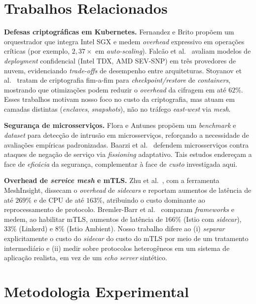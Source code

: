\documentclass[12pt]{article}
\begin{document}
\section{Trabalhos Relacionados}

\textbf{Defesas criptogr\'aficas em Kubernetes.} Fernandez e Brito \cite{fernandez2019} prop\~oem um orquestrador que integra Intel SGX e medem \textit{overhead} expressivo em opera\c{c}\~oes cr\'iticas (por exemplo, $2{,}37\times$ em \textit{auto-scaling}). Falc\~ao et al.\ \cite{falcao2025} avaliam modelos de \textit{deployment} confidencial (Intel TDX, AMD SEV-SNP) em tr\^es provedores de nuvem, evidenciando \textit{trade-offs} de desempenho entre arquiteturas. Stoyanov et al.\ \cite{stoyanov2024} tratam de criptografia fim-a-fim para \textit{checkpoint/restore} de \textit{containers}, mostrando que otimiza\c{c}\~oes podem reduzir o \textit{overhead} da cifragem em at\'e $62\%$. Esses trabalhos motivam nosso foco no custo da criptografia, mas atuam em camadas distintas (\textit{enclaves}, \textit{snapshots}), n\~ao no tr\'afego \textit{east-west} via \textit{mesh}.

\textbf{Seguran\c{c}a de microsservi\c{c}os.} Flora e Antunes \cite{flora2024} prop\~oem um \textit{benchmark} e \textit{dataset} para detec\c{c}\~ao de intrus\~ao em microsservi\c{c}os, refor\c{c}ando a necessidade de avalia\c{c}\~oes emp\'iricas padronizadas. Baarzi et al.\ \cite{baarzi2020} defendem microsservi\c{c}os contra ataques de nega\c{c}\~ao de servi\c{c}o via \textit{fissioning} adaptativo. Tais estudos endere\c{c}am a face de \emph{efic\'acia} da seguran\c{c}a, complementar \`a face de \emph{custo} investigada aqui.

\textbf{Overhead de \textit{service mesh} e mTLS.} Zhu et al.\ \cite{zhu2023}, com a ferramenta MeshInsight, dissecam o \textit{overhead} de \textit{sidecars} e reportam aumentos de lat\^encia de at\'e $269\%$ e de CPU de at\'e $163\%$, atribuindo o custo dominante ao reprocessamento de protocolo. Bremler-Barr et al.\ \cite{bremlerbarr2024} comparam \textit{frameworks} e medem, ao habilitar mTLS, aumentos de lat\^encia de $166\%$ (Istio com \textit{sidecar}), $33\%$ (Linkerd) e $8\%$ (Istio Ambient). Nosso trabalho difere ao (i) \emph{separar} explicitamente o custo do \textit{sidecar} do custo do mTLS por meio de um tratamento intermedi\'ario e (ii) medir sobre protocolos heterog\^eneos em um sistema de aplica\c{c}\~ao realista, em vez de um \textit{echo server} sint\'etico.

\section{Metodologia Experimental}
\end{document}
